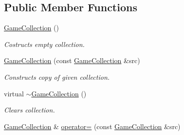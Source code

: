 \subsection*{Public Member Functions}
\begin{DoxyCompactItemize}
\item 
\hypertarget{classpgn_1_1GameCollection_a0e78c2029793a3a2397dc39b75d4149a}{
\hyperlink{classpgn_1_1GameCollection_a0e78c2029793a3a2397dc39b75d4149a}{GameCollection} ()}
\label{classpgn_1_1GameCollection_a0e78c2029793a3a2397dc39b75d4149a}

\begin{DoxyCompactList}\small\item\em Costructs empty collection. \item\end{DoxyCompactList}\item 
\hyperlink{classpgn_1_1GameCollection_abb270a0866bc52137748790264bfa17e}{GameCollection} (const \hyperlink{classpgn_1_1GameCollection}{GameCollection} \&src)
\begin{DoxyCompactList}\small\item\em Constructs copy of given collection. \item\end{DoxyCompactList}\item 
\hypertarget{classpgn_1_1GameCollection_a8119c3a8672c0bc2dbd9785f895e9136}{
virtual \hyperlink{classpgn_1_1GameCollection_a8119c3a8672c0bc2dbd9785f895e9136}{$\sim$GameCollection} ()}
\label{classpgn_1_1GameCollection_a8119c3a8672c0bc2dbd9785f895e9136}

\begin{DoxyCompactList}\small\item\em Clears collection. \item\end{DoxyCompactList}\item 
\hypertarget{classpgn_1_1GameCollection_ae5dc562b0cd630124cc598a31ef1df39}{
\hyperlink{classpgn_1_1GameCollection}{GameCollection} \& \hyperlink{classpgn_1_1GameCollection_ae5dc562b0cd630124cc598a31ef1df39}{operator=} (const \hyperlink{classpgn_1_1GameCollection}{GameCollection} \&src)}
\label{classpgn_1_1GameCollection_ae5dc562b0cd630124cc598a31ef1df39}


\end{DoxyCompactItemize}
